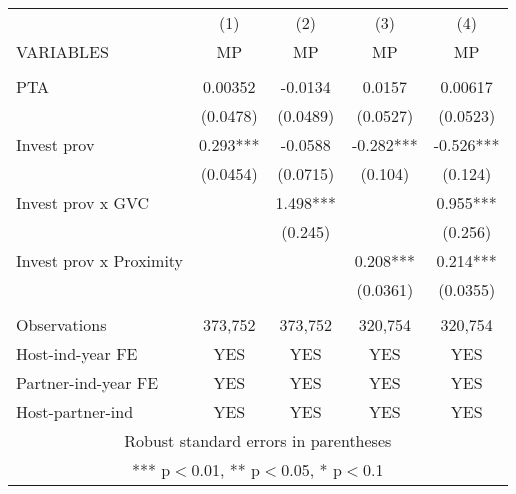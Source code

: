 \begin{tabular}{lcccc} \hline
 & (1) & (2) & (3) & (4) \\
VARIABLES & MP & MP & MP & MP \\ \hline
 &  &  &  &  \\
PTA & 0.00352 & -0.0134 & 0.0157 & 0.00617 \\
 & (0.0478) & (0.0489) & (0.0527) & (0.0523) \\
Invest prov & 0.293*** & -0.0588 & -0.282*** & -0.526*** \\
 & (0.0454) & (0.0715) & (0.104) & (0.124) \\
Invest prov x GVC &  & 1.498*** &  & 0.955*** \\
 &  & (0.245) &  & (0.256) \\
Invest prov x Proximity &  &  & 0.208*** & 0.214*** \\
 &  &  & (0.0361) & (0.0355) \\
 &  &  &  &  \\
Observations & 373,752 & 373,752 & 320,754 & 320,754 \\
Host-ind-year FE & YES & YES & YES & YES \\
Partner-ind-year FE & YES & YES & YES & YES \\
 Host-partner-ind & YES & YES & YES & YES \\ \hline
\multicolumn{5}{c}{ Robust standard errors in parentheses} \\
\multicolumn{5}{c}{ *** p$<$0.01, ** p$<$0.05, * p$<$0.1} \\
\end{tabular}
